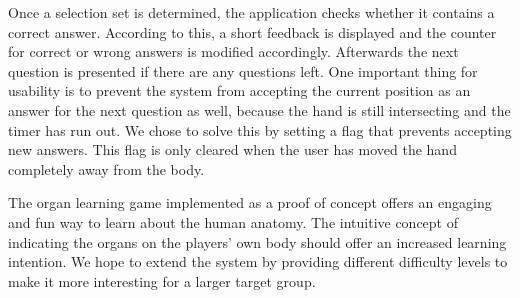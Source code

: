 Once a selection set is determined, the application checks whether it contains a correct answer. According to this, a short feedback is displayed and the counter for correct or wrong answers is modified accordingly. Afterwards the next question is presented if there are any questions left. One important thing for usability is to prevent the system from accepting the current position as an answer for the next question as well, because the hand is still intersecting and the timer has run out. We chose to solve this by setting a flag that prevents accepting new answers. This flag is only cleared when the user has moved the hand completely away from the body.

The organ learning game implemented as a proof of concept offers an engaging and fun way to learn about the human anatomy. The intuitive concept of indicating the organs on the players' own body should offer an increased learning intention. 
We hope to extend the system by providing different difficulty levels to make it more interesting for a larger target group.
 
